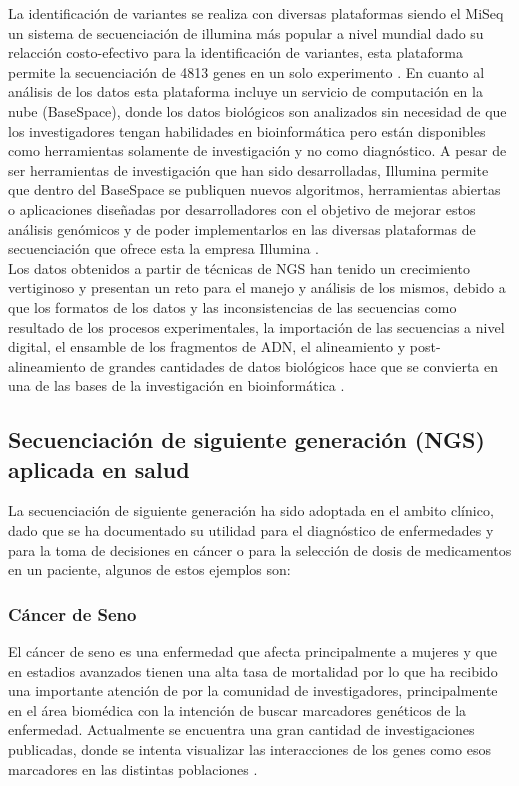 La identificación de variantes se realiza con diversas plataformas siendo el MiSeq un sistema de secuenciación de illumina  más popular a nivel mundial dado su relacción costo-efectivo para la identificación de variantes, esta plataforma permite la secuenciación de 4813 genes en un solo experimento \cite{Illumina2017}. En cuanto al análisis de los datos esta plataforma incluye un servicio de computación en la nube (BaseSpace), donde los datos biológicos son analizados  sin necesidad de que los investigadores tengan habilidades en bioinformática pero están disponibles como herramientas solamente de investigación y no como diagnóstico. A pesar de ser herramientas de investigación  que han sido desarrolladas, Illumina permite que dentro del BaseSpace se publiquen nuevos algoritmos, herramientas abiertas o aplicaciones diseñadas por desarrolladores con el objetivo de mejorar estos análisis genómicos y  de poder implementarlos en las diversas plataformas de secuenciación que ofrece esta la empresa Illumina \cite{Illumina2017}. \\

Los datos obtenidos a partir de técnicas de NGS han tenido un crecimiento vertiginoso y presentan un reto para el manejo y análisis de los mismos, debido a que los formatos de los datos y las inconsistencias de las secuencias como resultado de los procesos experimentales, la importación de las secuencias a nivel digital, el ensamble de los fragmentos de ADN, el alineamiento y post-alineamiento de grandes cantidades de datos biológicos hace que se convierta en una de las bases de la investigación en bioinformática \cite{Deng2011,Triplet2014}.

\subsection{Secuenciación de siguiente generación (NGS) aplicada en salud}

La secuenciación de siguiente generación ha sido adoptada en el ambito clínico, dado que se ha documentado su utilidad para el diagnóstico de enfermedades  y para la toma de decisiones en cáncer o para la selección de dosis de medicamentos en un paciente, \cite{Lubin2017} algunos de estos ejemplos son:

\subsubsection*{Cáncer de Seno}

El cáncer de seno es una enfermedad que afecta principalmente a mujeres y que en estadios avanzados tienen una alta tasa de mortalidad por lo que ha recibido una importante atención de por la comunidad de investigadores, principalmente en el área biomédica con la intención de buscar marcadores genéticos de la enfermedad. Actualmente se encuentra una gran cantidad de investigaciones publicadas, donde se intenta visualizar las interacciones de los genes como esos marcadores en las distintas poblaciones \cite{Jurca2016}.\\

